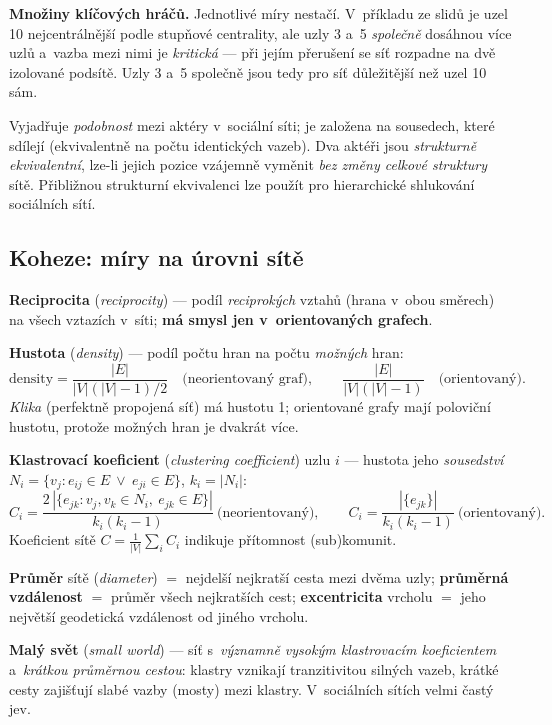 \documentclass[11pt,a4paper]{article}
\theoremstyle{definition}
\begin{document}
\textbf{Množiny klíčových hráčů.} Jednotlivé míry nestačí. V~příkladu ze slidů je uzel 10
nejcentrálnější podle stupňové centrality, ale uzly 3 a~5 \emph{společně} dosáhnou více uzlů
a~vazba mezi nimi je \emph{kritická} --- při jejím přerušení se síť rozpadne na dvě izolované
podsítě. Uzly 3 a~5 společně jsou tedy pro síť důležitější než uzel 10 sám.

\begin{defbox}
Vyjadřuje \emph{podobnost} mezi aktéry v~sociální síti; je založena na sousedech, které
sdílejí (ekvivalentně na počtu identických vazeb). Dva aktéři jsou \emph{strukturně
ekvivalentní}, lze-li jejich pozice vzájemně vyměnit \emph{bez změny celkové struktury} sítě.
Přibližnou strukturní ekvivalenci lze použít pro hierarchické shlukování sociálních sítí.
\end{defbox}

\subsection{Koheze: míry na úrovni sítě}

\begin{defbox}
\textbf{Reciprocita} (\emph{reciprocity}) --- podíl \emph{reciprokých} vztahů (hrana v~obou
směrech) na všech vztazích v~síti; \textbf{má smysl jen v~orientovaných grafech}.

\textbf{Hustota} (\emph{density}) --- podíl počtu hran na počtu \emph{možných} hran:
\[ \text{density}=\frac{|E|}{|V|(|V|-1)/2}\quad\text{(neorientovaný graf)},\qquad
   \frac{|E|}{|V|(|V|-1)}\quad\text{(orientovaný)}. \]
\emph{Klika} (perfektně propojená síť) má hustotu 1; orientované grafy mají poloviční
hustotu, protože možných hran je dvakrát více.

\textbf{Klastrovací koeficient} (\emph{clustering coefficient}) uzlu $i$ --- hustota jeho
\emph{sousedství} $N_i=\{v_j: e_{ij}\in E\ \vee\ e_{ji}\in E\}$, $k_i=|N_i|$:
\[ C_i=\frac{2\,|\{e_{jk}: v_j,v_k\in N_i,\ e_{jk}\in E\}|}{k_i(k_i-1)}
   \ \text{(neorientovaný)},\qquad
   C_i=\frac{|\{e_{jk}\}|}{k_i(k_i-1)}\ \text{(orientovaný)}. \]
Koeficient sítě $C=\frac{1}{|V|}\sum_i C_i$ indikuje přítomnost (sub)komunit.
\end{defbox}

\begin{defbox}
\textbf{Průměr} sítě (\emph{diameter}) $=$ nejdelší nejkratší cesta mezi dvěma uzly;
\textbf{průměrná vzdálenost} $=$ průměr všech nejkratších cest; \textbf{excentricita}
vrcholu $=$ jeho největší geodetická vzdálenost od jiného vrcholu.

\textbf{Malý svět} (\emph{small world}) --- síť s~\emph{významně vysokým klastrovacím
koeficientem} a~\emph{krátkou průměrnou cestou}: klastry vznikají tranzitivitou silných
vazeb, krátké cesty zajišťují slabé vazby (mosty) mezi klastry. V~sociálních sítích velmi
častý jev.
\end{defbox}
\end{document}
